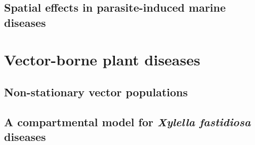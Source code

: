 \documentclass[
	10pt, %
	a4paper, %
]{LegrandOrangeBook}
\begin{document}
\chapterspaceabove{6.75cm}
\chapterspacebelow{7.25cm}

\chapter{Spatial effects in parasite-induced marine
  diseases}\label{ch:nacras_II}
%

{
	\hypersetup{hidelinks}
	\part{Vector-borne plant diseases}\label{part:VBD}
}
%

\chapterspaceabove{6.75cm}
\chapterspacebelow{7.25cm}

\chapter{Non-stationary vector populations}
%

\chapterspaceabove{6.75cm}
\chapterspacebelow{7.25cm}

\chapter{A compartmental model for \textit{Xylella fastidiosa} diseases}
\end{document}

